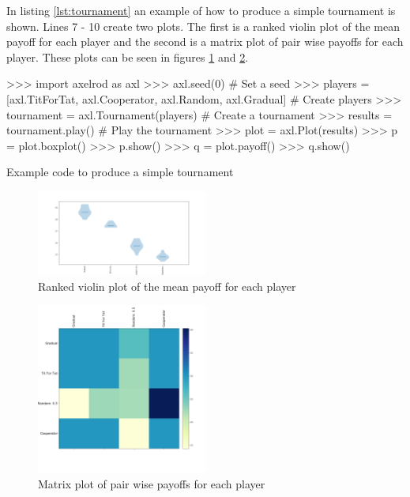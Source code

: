 In listing \ref{lst:tournament} an example of how to produce a simple tournament is shown.
Lines 7 - 10 create two plots.
The first is a ranked violin plot of the mean payoff for each player and the second is a matrix plot of pair wise payoffs for each player.
These plots can be seen in figures \ref{fig:violinplot} and \ref{fig:matrixplot}.

\begin{listing}[htbp!]
    \begin{ExampleCode}
        >>> import axelrod as axl
        >>> axl.seed(0)  # Set a seed
        >>> players = [axl.TitForTat, axl.Cooperator, axl.Random, axl.Gradual]  # Create players
        >>> tournament = axl.Tournament(players)  # Create a tournament
        >>> results = tournament.play()  # Play the tournament
        >>> plot = axl.Plot(results)
        >>> p = plot.boxplot()
        >>> p.show()
        >>> q = plot.payoff()
        >>> q.show()
    \end{ExampleCode}
    \caption{Example code to produce a simple tournament}
    \label{lst:tournament}
\end{listing}

\begin{figure}[hbtp!]
\centering
\includegraphics[width = 0.5\textwidth]{../img/examples/small_violin.png}
\caption{Ranked violin plot of the mean payoff for each player}
\label{fig:violinplot}
\end{figure}

\begin{figure}
\centering
\includegraphics[width = 0.5\textwidth]{../img/examples/small_payoff.png}
\caption{Matrix plot of pair wise payoffs for each player}
\label{fig:matrixplot}
\end{figure}

